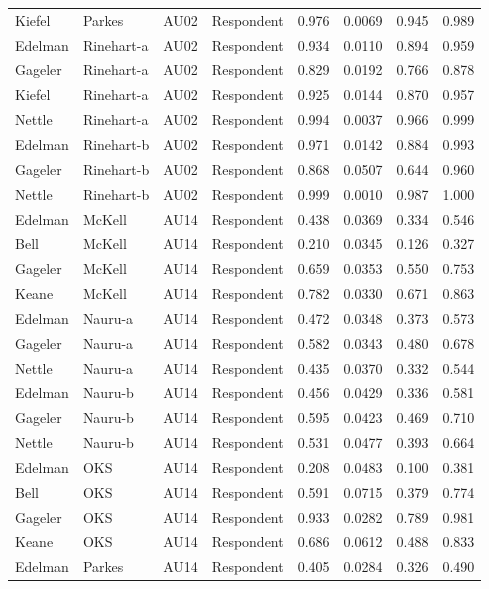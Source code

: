 \documentclass{monashthesis}
\begin{document}
\begin{center}
\begin{longtable}{llllllll}
Kiefel & Parkes & AU02 & Respondent & 0.976 & 0.0069 & 0.945 & 0.989 \\
Edelman & Rinehart-a & AU02 & Respondent & 0.934 & 0.0110 & 0.894 & 0.959 \\
Gageler & Rinehart-a & AU02 & Respondent & 0.829 & 0.0192 & 0.766 & 0.878 \\
Kiefel & Rinehart-a & AU02 & Respondent & 0.925 & 0.0144 & 0.870 & 0.957 \\
Nettle & Rinehart-a & AU02 & Respondent & 0.994 & 0.0037 & 0.966 & 0.999 \\
Edelman & Rinehart-b & AU02 & Respondent & 0.971 & 0.0142 & 0.884 & 0.993 \\
Gageler & Rinehart-b & AU02 & Respondent & 0.868 & 0.0507 & 0.644 & 0.960 \\
Nettle & Rinehart-b & AU02 & Respondent & 0.999 & 0.0010 & 0.987 & 1.000 \\
Edelman & McKell & AU14 & Respondent & 0.438 & 0.0369 & 0.334 & 0.546 \\
Bell & McKell & AU14 & Respondent & 0.210 & 0.0345 & 0.126 & 0.327 \\
Gageler & McKell & AU14 & Respondent & 0.659 & 0.0353 & 0.550 & 0.753 \\
Keane & McKell & AU14 & Respondent & 0.782 & 0.0330 & 0.671 & 0.863 \\
Edelman & Nauru-a & AU14 & Respondent & 0.472 & 0.0348 & 0.373 & 0.573 \\
Gageler & Nauru-a & AU14 & Respondent & 0.582 & 0.0343 & 0.480 & 0.678 \\
Nettle & Nauru-a & AU14 & Respondent & 0.435 & 0.0370 & 0.332 & 0.544 \\
Edelman & Nauru-b & AU14 & Respondent & 0.456 & 0.0429 & 0.336 & 0.581 \\
Gageler & Nauru-b & AU14 & Respondent & 0.595 & 0.0423 & 0.469 & 0.710 \\
Nettle & Nauru-b & AU14 & Respondent & 0.531 & 0.0477 & 0.393 & 0.664 \\
Edelman & OKS & AU14 & Respondent & 0.208 & 0.0483 & 0.100 & 0.381 \\
Bell & OKS & AU14 & Respondent & 0.591 & 0.0715 & 0.379 & 0.774 \\
Gageler & OKS & AU14 & Respondent & 0.933 & 0.0282 & 0.789 & 0.981 \\
Keane & OKS & AU14 & Respondent & 0.686 & 0.0612 & 0.488 & 0.833 \\
Edelman & Parkes & AU14 & Respondent & 0.405 & 0.0284 & 0.326 & 0.490 \\

\end{longtable}
\end{center}
\end{document}
